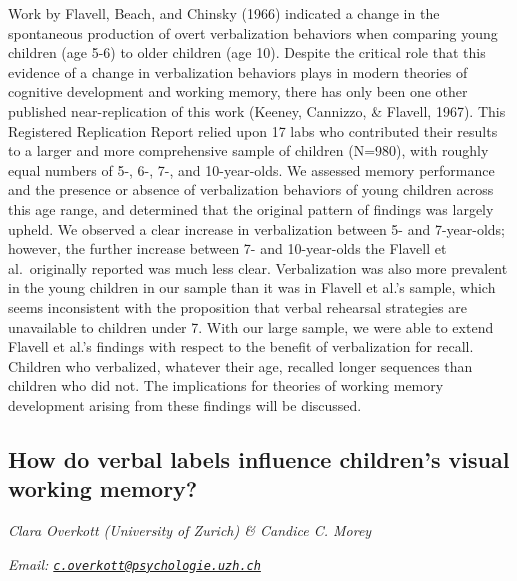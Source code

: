 \documentclass[12pt,]{book}
\begin{document}
Work by Flavell, Beach, and Chinsky (1966) indicated a change in the spontaneous production of overt verbalization behaviors when comparing young children (age 5-6) to older children (age 10). Despite the critical role that this evidence of a change in verbalization behaviors plays in modern theories of cognitive development and working memory, there has only been one other published near-replication of this work (Keeney, Cannizzo, \& Flavell, 1967). This Registered Replication Report relied upon 17 labs who contributed their results to a larger and more comprehensive sample of children (N=980), with roughly equal numbers of 5-, 6-, 7-, and 10-year-olds. We assessed memory performance and the presence or absence of verbalization behaviors of young children across this age range, and determined that the original pattern of findings was largely upheld. We observed a clear increase in verbalization between 5- and 7-year-olds; however, the further increase between 7- and 10-year-olds the Flavell et al.~originally reported was much less clear. Verbalization was also more prevalent in the young children in our sample than it was in Flavell et al.'s sample, which seems inconsistent with the proposition that verbal rehearsal strategies are unavailable to children under 7. With our large sample, we were able to extend Flavell et al.'s findings with respect to the benefit of verbalization for recall. Children who verbalized, whatever their age, recalled longer sequences than children who did not. The implications for theories of working memory development arising from these findings will be discussed.

\hypertarget{how-do-verbal-labels-influence-childrens-visual-working-memory}{%
\subsection{How do verbal labels influence children's visual working memory?}\label{how-do-verbal-labels-influence-childrens-visual-working-memory}}

\emph{Clara Overkott (University of Zurich) \& Candice C. Morey}

\emph{Email: \href{mailto:c.overkott@psychologie.uzh.ch}{\nolinkurl{c.overkott@psychologie.uzh.ch}}}
\end{document}
